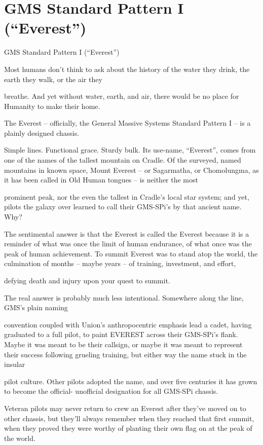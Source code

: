 \section{GMS Standard Pattern I (“Everest”)}

                                GMS Standard Pattern I (“Everest”)  

Most humans don’t think to ask about the history of the water they drink, the earth they walk, or the air they  

breathe. And yet without water, earth, and air, there would be no place for Humanity to make their home.   

The Everest -- officially, the General Massive Systems Standard Pattern I -- is a plainly designed chassis.  

Simple lines. Functional grace. Sturdy bulk. Its use-name, “Everest”, comes from one of the names of the  
tallest mountain on Cradle. Of the surveyed, named mountains in known space, Mount Everest -- or  
Sagarmatha, or Chomolungma, as it has been called in Old Human tongues -- is neither the most  

prominent peak, nor the even the tallest in Cradle’s local star system; and yet, pilots the galaxy over learned  
to call their GMS-SPi’s by that ancient name. Why?    

The sentimental answer is that the Everest is called the Everest because it is a reminder of what was once  
the limit of human endurance, of what once was the peak of human achievement. To summit Everest was  
to stand atop the world, the culmination of months -- maybe years -- of training, investment, and effort,  

defying death and injury upon your quest to summit.   

The real answer is probably much less intentional. Somewhere along the line, GMS’s plain naming  

convention coupled with Union’s anthropocentric emphasis lead a cadet, having graduated to a full pilot, to  
paint EVEREST across their GMS-SPi’s flank. Maybe it was meant to be their callsign, or maybe it was  
meant to represent their success following grueling training, but either way the name stuck in the insular  

pilot culture. Other pilots adopted the name, and over five centuries it has grown to become the official- 
unofficial designation for all GMS-SPi chassis.   

Veteran pilots may never return to crew an Everest after they’ve moved on to other chassis, but they’ll  
always remember when they reached that first summit, when they proved they were worthy of planting their  
own flag on at the peak of the world.   

